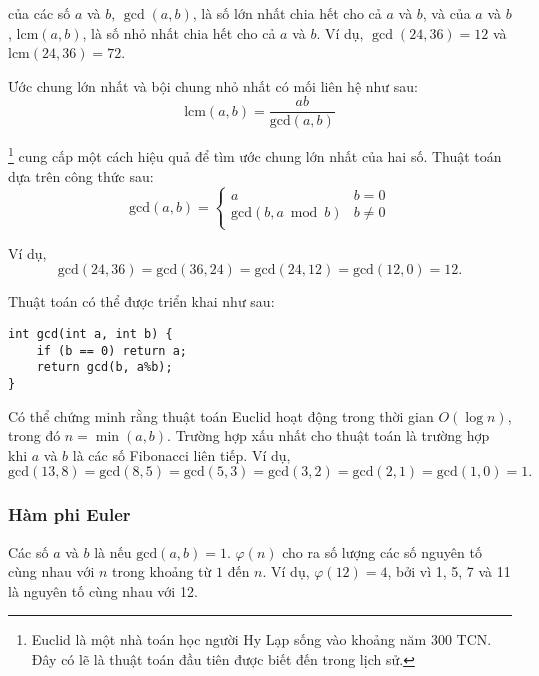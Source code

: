 
 của
các số $a$ và $b$, $\gcd(a,b)$,
là số lớn nhất chia hết cho cả $a$ và $b$,
và  của
$a$ và $b$, $\textrm{lcm}(a,b)$,
là số nhỏ nhất chia hết cho
cả $a$ và $b$.
Ví dụ,
$\gcd(24,36)=12$ và
$\textrm{lcm}(24,36)=72$.

Ước chung lớn nhất và bội chung nhỏ nhất
có mối liên hệ như sau:
\[\textrm{lcm}(a,b)=\frac{ab}{\textrm{gcd}(a,b)}\]

\footnote{Euclid là một nhà toán học người Hy Lạp sống vào khoảng năm 300 TCN. Đây có lẽ là thuật toán đầu tiên được biết đến trong lịch sử.} cung cấp một cách hiệu quả
để tìm ước chung lớn nhất của hai số.
Thuật toán dựa trên công thức sau:
\begin{equation*}
    \textrm{gcd}(a,b) = \begin{cases}
               a        & b = 0\\
               \textrm{gcd}(b,a \bmod b) & b \neq 0\\
           \end{cases}
\end{equation*}

Ví dụ,
\[\textrm{gcd}(24,36) = \textrm{gcd}(36,24)
= \textrm{gcd}(24,12) = \textrm{gcd}(12,0)=12.\]

Thuật toán có thể được triển khai như sau:
\begin{lstlisting}
int gcd(int a, int b) {
    if (b == 0) return a;
    return gcd(b, a%b);
}
\end{lstlisting}

Có thể chứng minh rằng thuật toán Euclid hoạt động
trong thời gian $O(\log n)$, trong đó $n=\min(a,b)$.
Trường hợp xấu nhất cho thuật toán là
trường hợp khi $a$ và $b$ là các số Fibonacci liên tiếp.
Ví dụ,
\[\textrm{gcd}(13,8)=\textrm{gcd}(8,5)
=\textrm{gcd}(5,3)=\textrm{gcd}(3,2)=\textrm{gcd}(2,1)=\textrm{gcd}(1,0)=1.\]

\subsubsection{Hàm phi Euler}


Các số $a$ và $b$ là 
nếu $\textrm{gcd}(a,b)=1$.
 $\varphi(n)$
cho ra số lượng các số nguyên tố cùng nhau với $n$
trong khoảng từ $1$ đến $n$.
Ví dụ, $\varphi(12)=4$,
bởi vì 1, 5, 7 và 11
là nguyên tố cùng nhau với 12.


